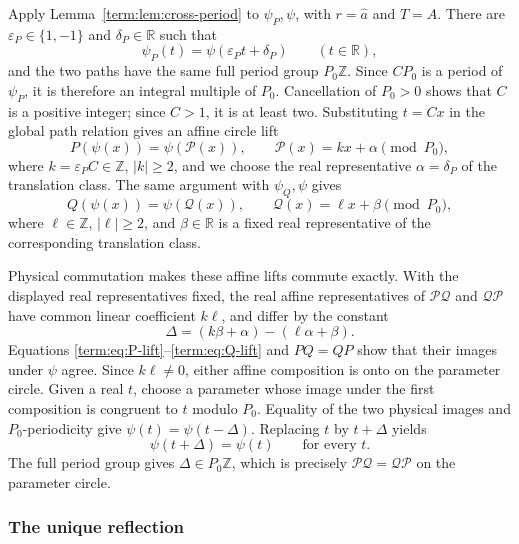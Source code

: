 \documentclass[11pt]{article}
\theoremstyle{definition}
\theoremstyle{remark}
\begin{document}
Apply Lemma~\ref{term:lem:cross-period} to \(\psi_P,\psi\), with
\(r=\widehat a\) and \(T=A\).  There are
\(\varepsilon_P\in\{1,-1\}\) and \(\delta_P\in\mathbb R\) such that
\[
 \psi_P(t)=\psi(\varepsilon_Pt+\delta_P)\qquad(t\in\mathbb R),
\]
and the two paths have the same full period group \(P_0\mathbb Z\).
Since \(CP_0\) is a period of \(\psi_P\), it is therefore an integral
multiple of \(P_0\).  Cancellation of \(P_0>0\) shows that \(C\) is a
positive integer; since \(C>1\), it is at least two.  Substituting \(t=Cx\)
in the global path relation gives an affine circle lift
\begin{equation}\label{term:eq:P-lift}
 P(\psi(x))=\psi(\mathcal P(x)),\qquad
 \mathcal P(x)=kx+\alpha\pmod{P_0},
\end{equation}
where \(k=\varepsilon_PC\in\mathbb Z\), \(|k|\geq2\), and we choose the
real representative \(\alpha=\delta_P\) of the translation class.  The same
argument with \(\psi_Q,\psi\) gives
\begin{equation}\label{term:eq:Q-lift}
 Q(\psi(x))=\psi(\mathcal Q(x)),\qquad
 \mathcal Q(x)=\ell x+\beta\pmod{P_0},
\end{equation}
where \(\ell\in\mathbb Z\), \(|\ell|\geq2\), and
\(\beta\in\mathbb R\) is a fixed real representative of the corresponding
translation class.

Physical commutation makes these affine lifts commute exactly.  With the
displayed real representatives fixed, the real affine representatives of
\(\mathcal P\mathcal Q\) and \(\mathcal Q\mathcal P\) have common linear
coefficient \(k\ell\), and differ by the constant
\[
 \Delta=(k\beta+\alpha)-(\ell\alpha+\beta).
\]
Equations \eqref{term:eq:P-lift}--\eqref{term:eq:Q-lift} and \(PQ=QP\)
show that their images under \(\psi\) agree.  Since \(k\ell\ne0\), either
affine composition is onto on the parameter circle.  Given a real \(t\),
choose a parameter whose image under the first composition is congruent to
\(t\) modulo \(P_0\).  Equality of the two physical images and
\(P_0\)-periodicity give \(\psi(t)=\psi(t-\Delta)\).  Replacing \(t\) by
\(t+\Delta\) yields
\[
 \psi(t+\Delta)=\psi(t)\qquad\text{for every }t.
\]
The full period group gives \(\Delta\in P_0\mathbb Z\), which is precisely
\(\mathcal P\mathcal Q=\mathcal Q\mathcal P\) on the parameter circle.

\subsubsection{The unique reflection}
\end{document}
